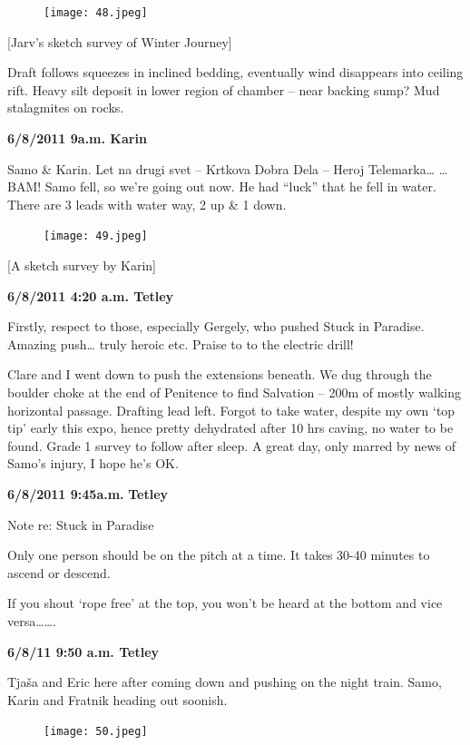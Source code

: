 \begin{figure}[htbp]
\centering
\texttt{[image: 48.jpeg]}
\caption{}
\end{figure}

{[}Jarv's sketch survey of Winter Journey{]}

Draft follows squeezes in inclined bedding, eventually wind disappears
into ceiling rift. Heavy silt deposit in lower region of chamber -- near
backing sump? Mud stalagmites on rocks.

\textbf{6/8/2011 9a.m. Karin}

Samo \& Karin. Let na drugi svet -- Krtkova Dobra Dela -- Heroj
Telemarka\ldots{} \ldots{}BAM! Samo fell, so we're going out now. He had
``luck'' that he fell in water. There are 3 leads with water way, 2 up
\& 1 down.

\begin{figure}[htbp]
\centering
\texttt{[image: 49.jpeg]}
\caption{}
\end{figure}

{[}A sketch survey by Karin{]}

\textbf{6/8/2011 4:20 a.m. Tetley}

Firstly, respect to those, especially Gergely, who pushed Stuck in
Paradise. Amazing push\ldots{} truly heroic etc. Praise to to the
electric drill!

Clare and I went down to push the extensions beneath. We dug through the
boulder choke at the end of Penitence to find Salvation -- 200m of
mostly walking horizontal passage. Drafting lead left. Forgot to take
water, despite my own `top tip' early this expo, hence pretty dehydrated
after 10 hrs caving, no water to be found. Grade 1 survey to follow
after sleep. A great day, only marred by news of Samo's injury, I hope
he's OK.

\textbf{6/8/2011 9:45a.m.} \textbf{Tetley}

Note re: Stuck in Paradise

Only one person should be on the pitch at a time. It takes 30-40 minutes
to ascend or descend.

If you shout `rope free' at the top, you won't be heard at the bottom
and vice versa\ldots{}\ldots{}.

\textbf{6/8/11 9:50 a.m. Tetley}

Tjaša and Eric here after coming down and pushing on the night train.
Samo, Karin and Fratnik heading out soonish.

\begin{figure}[htbp]
\centering
\texttt{[image: 50.jpeg]}
\caption{}
\end{figure}

